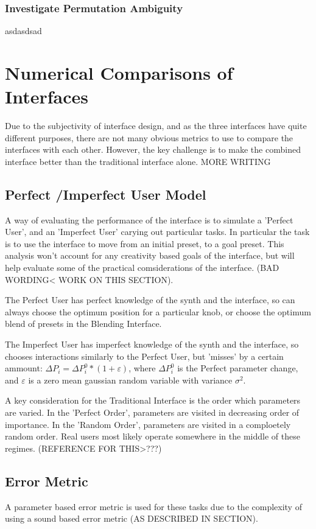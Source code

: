 \documentclass[11pt, oneside]{report}   	%
\begin{document}
\subsection{Investigate Permutation Ambiguity}
asdasdsad

\chapter{Numerical Comparisons of Interfaces}
Due to the subjectivity of interface design, and as the three interfaces have quite different purposes, there are not many obvious metrics to use to compare the interfaces with each other. However, the key challenge is to make the combined interface better than the traditional interface alone. MORE WRITING
\section{Perfect /Imperfect User Model}
A way of evaluating the performance of the interface is to simulate a 'Perfect User', and an 'Imperfect User' carying out particular tasks. In particular the task is to use the interface to move from an initial preset, to a goal preset. This analysis won't account for any creativity based goals of the interface, but will help evaluate some of the practical comsiderations of the interface. (BAD WORDING< WORK ON THIS SECTION).
 
The Perfect User has perfect knowledge of the synth and the interface, so can always choose the optimum position for a particular knob, or choose the optimum blend of presets in the Blending Interface.

The Imperfect User has imperfect knowledge of the synth and the interface, so chooses interactions similarly to the Perfect User, but 'misses' by a certain ammount: $\Delta P_i = \Delta P_i^0 * (1 + \varepsilon)$, where $\Delta P_i^0$ is the Perfect parameter change, and $\varepsilon$ is a zero mean gaussian random variable with variance $\sigma^2$.

A key consideration for the Traditional Interface is the order which parameters are varied. In the 'Perfect Order', parameters are visited in decreasing order of importance. In the 'Random Order', parameters are visited in a comploetely random order. Real users most likely operate somewhere in the middle of these regimes. (REFERENCE FOR THIS>???)

\section{Error Metric}
A parameter based error metric is used for these tasks due to the complexity of using a sound based error metric (AS DESCRIBED IN SECTION). 
\end{document}
